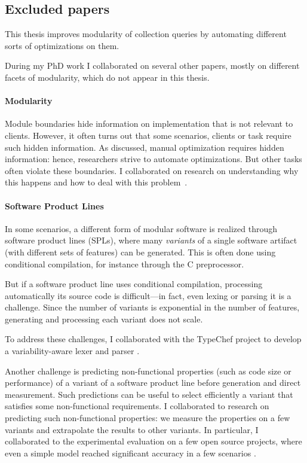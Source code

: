 
\subsection{Excluded papers}
This thesis improves modularity of collection queries by automating different sorts of
optimizations on them.

During my PhD work I collaborated on several other papers, mostly on different facets of
modularity, which do not appear in this thesis.

\paragraph{Modularity}
Module boundaries hide information on implementation that is not relevant to
clients. However, it often turns out that some scenarios, clients or task
require such hidden information. As discussed, manual optimization requires
hidden information: hence, researchers strive to automate optimizations. But
other tasks often violate these boundaries. I collaborated on research on
understanding why this happens and how to deal with this
problem~\citep*{OGKR:ECOOP11}.

\paragraph{Software Product Lines}
In some scenarios, a different form of modular software is realized through
software product lines (SPLs), where many \emph{variants} of a single software
artifact (with different sets of features) can be generated. This is often done
using conditional compilation, for instance through the C preprocessor.

But if a software product line uses conditional compilation, processing
automatically its source code is difficult---in fact, even lexing or parsing it
is a challenge. Since the number of variants is exponential in the number of
features, generating and processing each variant does not scale.

To address these
challenges, I collaborated with the TypeChef project to develop a
variability-aware lexer \citep*{KPO:VaMoS11} and parser
\citep*{KGREOB:OOPSLA11}.

Another challenge is predicting non-functional properties (such as code size or
performance) of a variant of a software product line before generation and
direct measurement. Such predictions can be useful to select efficiently a
variant that satisfies some non-functional requirements.
I collaborated to research on predicting such non-functional properties: we
measure the properties on a few variants and extrapolate the results to other
variants. In particular, I collaborated to the experimental evaluation on a few
open source projects, where even a simple model reached significant accuracy in a
few scenarios \citep*{SRKGAK:SPLC11,siegmund2013scalable}.

